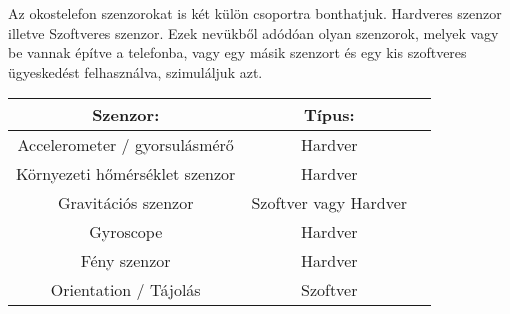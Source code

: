 \documentclass{thesis-ekf}
\theoremstyle{definition}
\theoremstyle{remark}
\begin{document}
\par Az okostelefon szenzorokat is két külön csoportra bonthatjuk. Hardveres szenzor illetve Szoftveres szenzor. Ezek nevükből adódóan olyan szenzorok, melyek vagy be vannak építve a telefonba, vagy egy másik szenzort és egy kis szoftveres ügyeskedést felhasználva, szimuláljuk azt.
\begin{center}
	\begin{tabular}{ |c|c|c| } 
		\hline
		Szenzor: & Típus: \\
		\hline\hline
		Accelerometer / gyorsulásmérő & Hardver  \\
		\hline
		Környezeti hőmérséklet szenzor & Hardver \\
		\hline
		Gravitációs szenzor & Szoftver vagy Hardver \\
		\hline
		Gyroscope & Hardver \\
		\hline
		Fény szenzor & Hardver \\
		\hline
		Orientation / Tájolás & Szoftver \\
		\hline
	\end{tabular}
\end{center}
\end{document}
